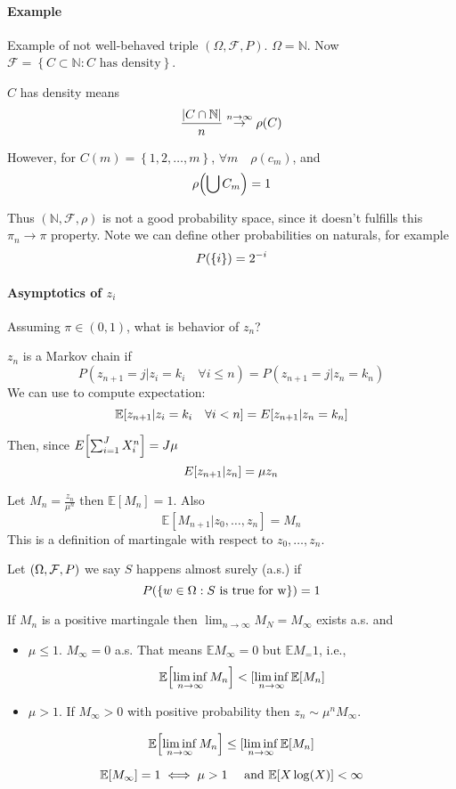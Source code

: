 


\paragraph{Example}
Example of not well-behaved triple $(\Omega, \mathcal{F}, P)$. $\Omega =\mathbb{N}$. Now $\mathcal{F} = \left\{  C\subset \mathbb{N} : C \text{ has density} \right\}$.

$C$ has density means 
$$\frac{\abs{C \cap \mathbb{N}}}{n} \stackrel{n\to \infty}{\to} \rho(C)$$

However, for $C(m) = \left\{  1,2,\dots, m \right\}$, $\forall m \quad \rho(c_m)$, and 
$$\rho\qty(\bigcup C_m ) = 1$$

Thus $(\mathbb{N}, \mathcal{F}, \rho)$ is not a good probability space, since it doesn't fulfills this
$\pi_n\to \pi$ property. Note we can define other probabilities on naturals, for example
$$P\qty(\left\{ i \right\}) = 2^{-i}$$


\paragraph{Asymptotics of $z_i$ }
Assuming $\pi \in (0,1)$, what is behavior of $z_n$?
\begin{definition}
	$z_n$ is a Markov chain if 
	$$P(z_{n+1}=j|z_i=k_i \quad \forall i\leq n) = P(z_{n+1} = j | z_n=k_n)$$
	We can use to compute expectation:
	$$\mathbb{E}[z_{n+1}|z_i=k_i \quad \forall i<n] = E\qty[z_{n+1}|z_n=k_n]$$
\end{definition}

Then, since $E\qty[\sum_{i=1}^J X_i^n] = J\mu$
$$E\qty[z_{n+1}|z_n] = \mu z_n$$

Let $M_n = \frac{z_n}{\mu^n}$ then $\mathbb{E}[M_n] = 1$. Also
$$\mathbb{E}[M_{n+1}|z_0,\dots, z_n] = M_n$$
This is a definition of martingale with respect to $z_0, \dots, z_n$.

Let $\qty(\Omega, \mathcal{F}, P)$ we say $S$ happens almost surely (a.s.) if $$P\qty(\left\{ w\in \Omega : S \text{ is true for w} \right\}) = 1$$
\begin{theorem}
	If $M_n$ is a positive martingale then $\lim_{n\to \infty} M_N=M_\infty$ exists a.s. and 
	\begin{itemize}
		\item $\mu \leq 1$. $M_\infty =0 $ a.s. That means $\mathbb{E}M_\infty = 0$ but $\mathbb{E} M_ = 1$, i.e., 
		$$\mathbb{E}\qty[\liminf_{n\to \infty} M_n] < [\liminf_{n\to \infty} \mathbb{E}\qty[M_n]$$ 
		\item $\mu>1$. If $M_\infty > 0$ with positive probability then $z_n \sim \mu^n M_\infty$.  
	\end{itemize}
\end{theorem}


\begin{lemma}
	$$\mathbb{E}\qty[\liminf_{n\to \infty} M_n] \leq [\liminf_{n\to \infty} \mathbb{E}\qty[M_n]$$ 
\end{lemma}

\begin{theorem}
	$$\mathbb{E} \qty[M_\infty] = 1 \iff \mu>1 \quad \text{ and } \mathbb{E}\qty[X \log(X)] < \infty$$
\end{theorem}

